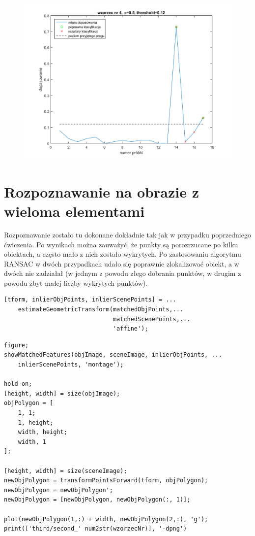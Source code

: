 \documentclass[a4paper, 12pt, titlepage]{article}
\begin{document}
            \begin{figure}[H]
                \centering
                \includegraphics[width=0.8\linewidth]{second_rozpoznane/metric_4.png}
            \end{figure}
    \section{Rozpoznawanie na obrazie z wieloma elementami}            
        Rozpoznawanie zostało tu dokonane dokładnie tak jak w przypadku poprzedniego
        ćwiczenia. Po wynikach można zauważyć, że punkty są porozrzucane po kilku
        obiektach, a często mało z nich zostało wykrytych. Po zastosowaniu algorytmu
        RANSAC w dwóch przypadkach udało się poprawnie zlokalizować obiekt, a w 
        dwóch nie zadziałał (w jednym z powodu złego dobrania punktów, w drugim z 
        powodu zbyt małej liczby wykrytych punktów).
\begin{lstlisting}
[tform, inlierObjPoints, inlierScenePoints] = ...
    estimateGeometricTransform(matchedObjPoints,...
                               matchedScenePoints,...
                               'affine');

\end{lstlisting}
\begin{lstlisting}
figure;
showMatchedFeatures(objImage, sceneImage, inlierObjPoints, ...        
    inlierScenePoints, 'montage');

hold on;
[height, width] = size(objImage);
objPolygon = [
    1, 1;
    1, height;
    width, height;
    width, 1
];

[height, width] = size(sceneImage);
newObjPolygon = transformPointsForward(tform, objPolygon);
newObjPolygon = newObjPolygon';
newObjPolygon = [newObjPolygon, newObjPolygon(:, 1)];

plot(newObjPolygon(1,:) + width, newObjPolygon(2,:), 'g');
print(['third/second_' num2str(wzorzecNr)], '-dpng')
\end{lstlisting}
\end{document}
